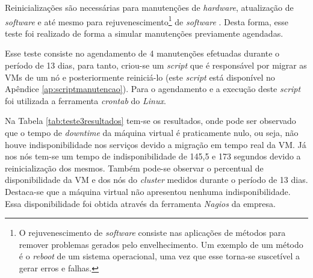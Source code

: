 Reinicializações são necessárias para manutenções de \textit{hardware}, atualização de \textit{software} e até mesmo para 
rejuvenescimento\footnote{O rejuvenescimento de \textit{software} consiste nas aplicações de métodos para remover problemas gerados pelo 
envelhecimento. Um exemplo de um método é o \textit{reboot} de um sistema operacional, uma vez que esse torna-se suscetível a gerar erros e 
falhas.} de \textit{software} \cite{melo2014}. Desta forma, esse teste foi realizado de forma a simular manutenções previamente agendadas.



Esse teste consiste no agendamento de 4 manutenções efetuadas durante o período de 13 dias, para tanto, criou-se um \textit{script} que é 
responsável por migrar as \acp{VM} de um nó e posteriormente reiniciá-lo (este \textit{script} está disponível no Apêndice 
\ref{ap:scriptmanutencao}). Para o agendamento e a execução deste \textit{script} foi utilizada a ferramenta \textit{crontab} do \textit{Linux}. 

Na Tabela \ref{tab:teste3resultados} tem-se os resultados, onde pode ser observado que o tempo de \textit{downtime} da máquina virtual 
é praticamente nulo, ou seja, não houve indisponibilidade nos serviços devido a migração em tempo real da \ac{VM}. 
Já nos nós tem-se um tempo de indisponibilidade de 145,5 e 173 segundos devido a reinicialização dos mesmos.
Também pode-se observar o percentual de disponibilidade da \ac{VM} e dos nós do \textit{cluster} medidos durante o período de 13 dias.
Destaca-se que a máquina virtual não apresentou nenhuma indisponibilidade. Essa disponibilidade foi obtida através da ferramenta 
\textit{Nagios} \cite{nagios} da empresa.


